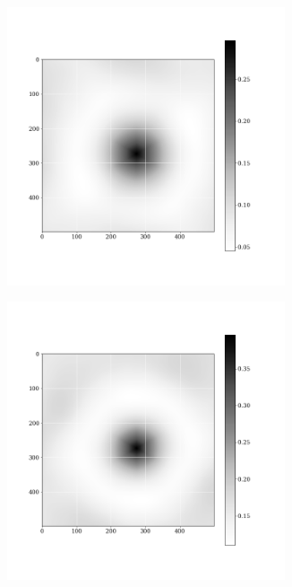 \documentclass[12pt, a4paper]{report}
\begin{document}
\begin{figure}[H]
\begin{subfigure}{.32\textwidth}
  \centering
  \includegraphics[width=0.9\textwidth]{Pictures/images9/hex_image_03_560.png}
  \label{img:microstrImg}
\end{subfigure}
\begin{subfigure}{.32\textwidth}
  \centering
  \includegraphics[width=0.9\textwidth]{Pictures/images9/hex_image_04_560.png}

\end{subfigure}
\end{figure}
\end{document}
